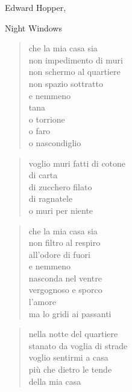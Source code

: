 \clearpage


\begin{artItem}
	Edward Hopper, \begin{otherlanguage}{english}%
		Night Windows%
	\end{otherlanguage}
\end{artItem}

	\begin{verse}
		che la mia casa sia\\
		non impedimento di muri\\
		non schermo al quartiere\\
		non spazio sottratto\\
		e nemmeno\\
		tana\\
		o torrione\\
		o faro\\
		o nascondiglio
	\end{verse}

	\begin{verse}
		voglio muri fatti di cotone\\
		di carta\\
		di zucchero filato\\
		di ragnatele\\
		o muri per niente
	\end{verse}

	\begin{verse}
		che la mia casa sia\\
		non filtro al respiro\\
		all'odore di fuori\\
		e nemmeno\\
		nasconda nel ventre\\
		vergognoso e sporco\\
		l'amore\\
		ma lo gridi ai passanti
	\end{verse}

	\begin{verse}
		nella notte del quartiere\\
		stanato da voglia di strade\\
		voglio sentirmi a casa\\
		più che dietro le tende\\
		della mia casa
	\end{verse}

\clearpage


